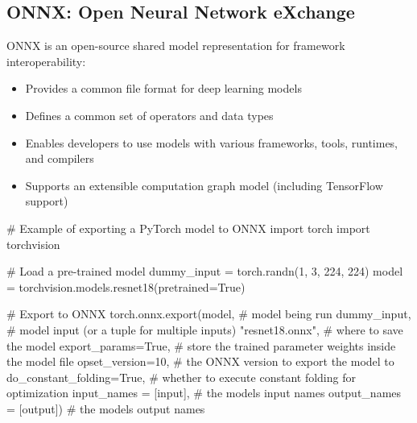 \documentclass[
  letterpaper,
  DIV=11,
  numbers=noendperiod]{scrreprt}
\newenvironment{Shaded}{\begin{snugshade}}{\end{snugshade}}
\newcommand{\CommentTok}[1]{\textcolor[rgb]{0.37,0.37,0.37}{#1}}
\newcommand{\DecValTok}[1]{\textcolor[rgb]{0.68,0.00,0.00}{#1}}
\newcommand{\ImportTok}[1]{\textcolor[rgb]{0.00,0.46,0.62}{#1}}
\newcommand{\NormalTok}[1]{\textcolor[rgb]{0.00,0.23,0.31}{#1}}
\newcommand{\OperatorTok}[1]{\textcolor[rgb]{0.37,0.37,0.37}{#1}}
\newcommand{\StringTok}[1]{\textcolor[rgb]{0.13,0.47,0.30}{#1}}
\newcommand{\VariableTok}[1]{\textcolor[rgb]{0.07,0.07,0.07}{#1}}
\providecommand{\tightlist}{%
  \setlength{\itemsep}{0pt}\setlength{\parskip}{0pt}}\usepackage{longtable,booktabs,array}
\begin{document}
\subsection{ONNX: Open Neural Network
eXchange}\label{onnx-open-neural-network-exchange}

ONNX is an open-source shared model representation for framework
interoperability:

\begin{itemize}
\tightlist
\item
  Provides a common file format for deep learning models
\item
  Defines a common set of operators and data types
\item
  Enables developers to use models with various frameworks, tools,
  runtimes, and compilers
\item
  Supports an extensible computation graph model (including TensorFlow
  support)
\end{itemize}

\begin{Shaded}
\begin{Highlighting}[]
\CommentTok{\# Example of exporting a PyTorch model to ONNX}
\ImportTok{import}\NormalTok{ torch}
\ImportTok{import}\NormalTok{ torchvision}

\CommentTok{\# Load a pre{-}trained model}
\NormalTok{dummy\_input }\OperatorTok{=}\NormalTok{ torch.randn(}\DecValTok{1}\NormalTok{, }\DecValTok{3}\NormalTok{, }\DecValTok{224}\NormalTok{, }\DecValTok{224}\NormalTok{)}
\NormalTok{model }\OperatorTok{=}\NormalTok{ torchvision.models.resnet18(pretrained}\OperatorTok{=}\VariableTok{True}\NormalTok{)}

\CommentTok{\# Export to ONNX}
\NormalTok{torch.onnx.export(model,               }\CommentTok{\# model being run}
\NormalTok{                  dummy\_input,         }\CommentTok{\# model input (or a tuple for multiple inputs)}
                  \StringTok{"resnet18.onnx"}\NormalTok{,     }\CommentTok{\# where to save the model}
\NormalTok{                  export\_params}\OperatorTok{=}\VariableTok{True}\NormalTok{,  }\CommentTok{\# store the trained parameter weights inside the model file}
\NormalTok{                  opset\_version}\OperatorTok{=}\DecValTok{10}\NormalTok{,    }\CommentTok{\# the ONNX version to export the model to}
\NormalTok{                  do\_constant\_folding}\OperatorTok{=}\VariableTok{True}\NormalTok{,  }\CommentTok{\# whether to execute constant folding for optimization}
\NormalTok{                  input\_names }\OperatorTok{=}\NormalTok{ [}\StringTok{\textquotesingle{}input\textquotesingle{}}\NormalTok{],   }\CommentTok{\# the model\textquotesingle{}s input names}
\NormalTok{                  output\_names }\OperatorTok{=}\NormalTok{ [}\StringTok{\textquotesingle{}output\textquotesingle{}}\NormalTok{]) }\CommentTok{\# the model\textquotesingle{}s output names}
\end{Highlighting}
\end{Shaded}
\end{document}
